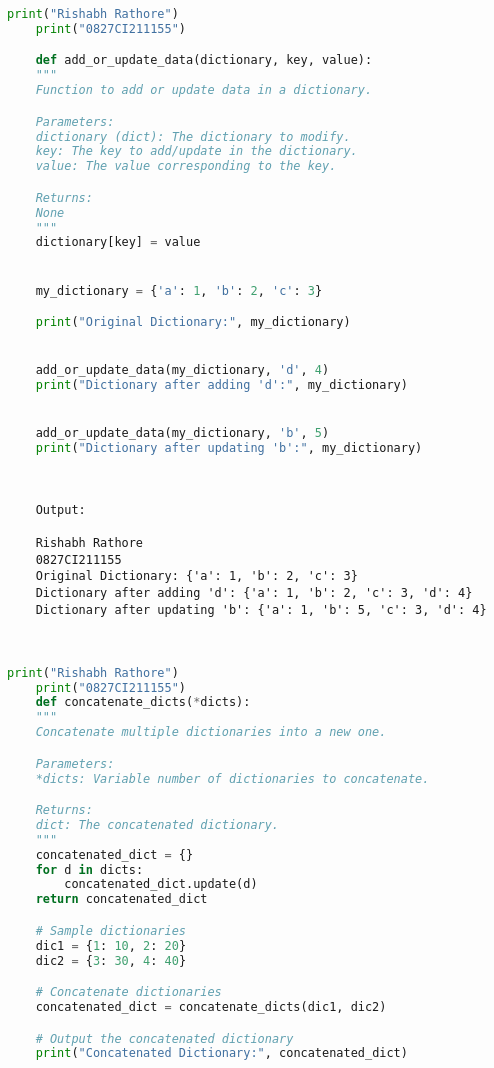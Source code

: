 \documentclass{report}
\begin{document}
\newpage


\sol 
\begin{lstlisting}[language=Python]
	print("Rishabh Rathore")
	print("0827CI211155")

	def add_or_update_data(dictionary, key, value):
    """
    Function to add or update data in a dictionary.

    Parameters:
    dictionary (dict): The dictionary to modify.
    key: The key to add/update in the dictionary.
    value: The value corresponding to the key.

    Returns:
    None
    """
    dictionary[key] = value


	my_dictionary = {'a': 1, 'b': 2, 'c': 3}

	print("Original Dictionary:", my_dictionary)


	add_or_update_data(my_dictionary, 'd', 4)
	print("Dictionary after adding 'd':", my_dictionary)


	add_or_update_data(my_dictionary, 'b', 5)
	print("Dictionary after updating 'b':", my_dictionary)

  

\end{lstlisting}

\begin{verbatim}
	Output:

	Rishabh Rathore
	0827CI211155
	Original Dictionary: {'a': 1, 'b': 2, 'c': 3}
	Dictionary after adding 'd': {'a': 1, 'b': 2, 'c': 3, 'd': 4}
	Dictionary after updating 'b': {'a': 1, 'b': 5, 'c': 3, 'd': 4}

	

\end{verbatim}


\newpage


\sol 
\begin{lstlisting}[language=Python]
	print("Rishabh Rathore")
	print("0827CI211155")
	def concatenate_dicts(*dicts):
    """
    Concatenate multiple dictionaries into a new one.

    Parameters:
    *dicts: Variable number of dictionaries to concatenate.

    Returns:
    dict: The concatenated dictionary.
    """
    concatenated_dict = {}
    for d in dicts:
        concatenated_dict.update(d)
    return concatenated_dict

	# Sample dictionaries
	dic1 = {1: 10, 2: 20}
	dic2 = {3: 30, 4: 40}

	# Concatenate dictionaries
	concatenated_dict = concatenate_dicts(dic1, dic2)

	# Output the concatenated dictionary
	print("Concatenated Dictionary:", concatenated_dict)


\end{lstlisting}
\end{document}

